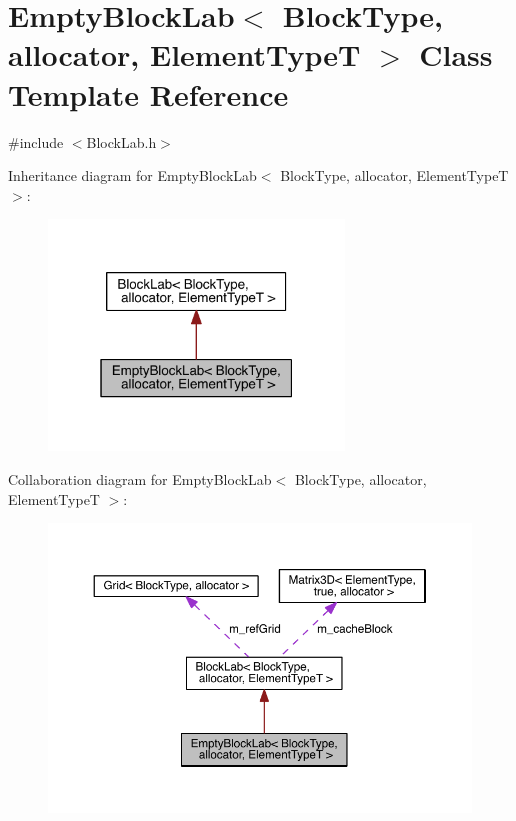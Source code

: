 \hypertarget{class_empty_block_lab}{}\section{Empty\+Block\+Lab$<$ Block\+Type, allocator, Element\+Type\+T $>$ Class Template Reference}
\label{class_empty_block_lab}


{\ttfamily \#include $<$Block\+Lab.\+h$>$}



Inheritance diagram for Empty\+Block\+Lab$<$ Block\+Type, allocator, Element\+Type\+T $>$\+:\nopagebreak
\begin{figure}[H]
\begin{center}
\leavevmode
\includegraphics[width=223pt]{d9/d4f/class_empty_block_lab__inherit__graph}
\end{center}
\end{figure}


Collaboration diagram for Empty\+Block\+Lab$<$ Block\+Type, allocator, Element\+Type\+T $>$\+:\nopagebreak
\begin{figure}[H]
\begin{center}
\leavevmode
\includegraphics[width=350pt]{d8/df4/class_empty_block_lab__coll__graph}
\end{center}
\end{figure}
